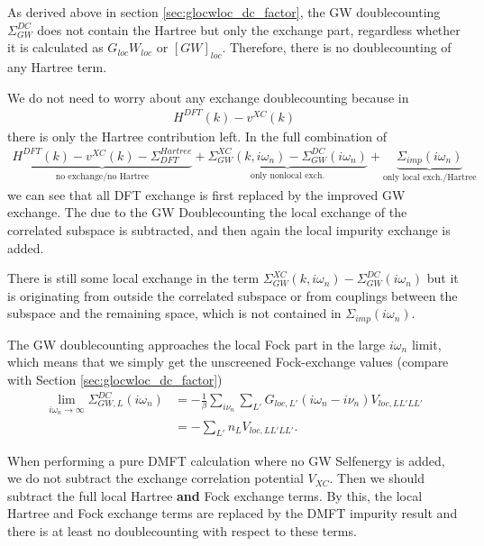 \documentclass[12pt,a4paper]{scrartcl}
\numberwithin{equation}{section}
\begin{document}
As derived above in section \ref{sec:glocwloc_dc_factor},
the GW doublecounting $\Sigma_{GW}^{DC}$ does not contain the Hartree but only the exchange part,
regardless whether it is calculated as $G_{loc}W_{loc}$ or $[GW]_{loc}$.
Therefore, there is no doublecounting of any Hartree term.

\bigskip

We do not need to worry about any exchange doublecounting because in
\begin{align}
 H^{DFT}(k) - v^{XC}(k)
\end{align}
there is only the Hartree contribution left. In the full
combination of 
\begin{align}
 \underbrace{H^{DFT}(k) - v^{XC}(k) - \Sigma^{Hartree}_{DFT}}_{\mbox{no exchange/no Hartree}}
          + \underbrace{\Sigma^{XC}_{GW}(k,i\omega_n) - \Sigma_{GW}^{DC}(i\omega_n)}_{\mbox{only nonlocal exch.}}
          + \underbrace{\Sigma_{imp}(i\omega_n)}_{\mbox{only local exch./Hartree}}
\end{align}
we can see that all DFT exchange is first replaced by the improved GW exchange.
The due to the GW Doublecounting the local exchange of the correlated subspace
is subtracted, and then again the local impurity exchange is added.

There is still some local exchange in the term 
$\Sigma^{XC}_{GW}(k,i\omega_n) - \Sigma_{GW}^{DC}(i\omega_n)$ but it is originating
from outside the correlated subspace or from couplings between the subspace and the remaining
space, which is not contained in $\Sigma_{imp}(i\omega_n)$.

The GW doublecounting approaches the local Fock part in the large $i\omega_n$ limit,
which means that we simply get the unscreened Fock-exchange 
values (compare with Section \ref{sec:glocwloc_dc_factor})
\begin{align}
\lim_{i\omega_n\rightarrow \infty} \Sigma^{DC}_{GW,L}(i\omega_n) 
&= -\frac{1}{\beta} \sum_{i\nu_n}\sum_{L'} G_{loc,L'}(i\omega_n-i\nu_n)V_{loc,LL'LL'} \\
&= - \sum_{L'} n_LV_{loc,LL'LL'} .
\end{align}


When performing a pure DMFT calculation where no GW Selfenergy is added,
we do not subtract the exchange correlation potential $V_{XC}$.
Then we should subtract the full local Hartree \textbf{and} Fock exchange terms.
By this, the local Hartree and Fock exchange terms are replaced by the DMFT impurity
result and there is at least no doublecounting with respect to these terms. 
\end{document}
